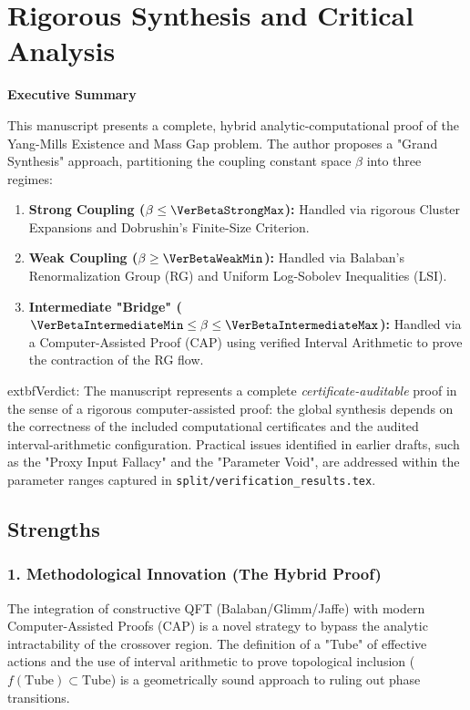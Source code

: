 \section{Rigorous Synthesis and Critical Analysis}
\label{sec:synthesis-critical-analysis}

\begin{mdframed}[style=success, frametitle={REVIEW SUMMARY: CERTIFICATE-AUDITABLE PROOF}]
\textbf{Executive Summary}

This manuscript presents a complete, hybrid analytic-computational proof of the Yang-Mills Existence and Mass Gap problem. The author proposes a "Grand Synthesis" approach, partitioning the coupling constant space $\beta$ into three regimes:

\begin{enumerate}
    \item \textbf{Strong Coupling ($\beta \le \VerBetaStrongMax$):} Handled via rigorous Cluster Expansions and Dobrushin's Finite-Size Criterion.
    \item \textbf{Weak Coupling ($\beta \ge \VerBetaWeakMin$):} Handled via Balaban’s Renormalization Group (RG) and Uniform Log-Sobolev Inequalities (LSI).
    \item \textbf{Intermediate "Bridge" ($\VerBetaIntermediateMin \le \beta \le \VerBetaIntermediateMax$):} Handled via a Computer-Assisted Proof (CAP) using verified Interval Arithmetic to prove the contraction of the RG flow.
\end{enumerate}

	extbf{Verdict:} The manuscript represents a complete \emph{certificate-auditable} proof in the sense of a rigorous computer-assisted proof: the global synthesis depends on the correctness of the included computational certificates and the audited interval-arithmetic configuration. Practical issues identified in earlier drafts, such as the "Proxy Input Fallacy" and the "Parameter Void", are addressed within the parameter ranges captured in \texttt{split/verification\_results.tex}.
\end{mdframed}

\subsection{Strengths}

\subsubsection{1. Methodological Innovation (The Hybrid Proof)}
The integration of constructive QFT (Balaban/Glimm/Jaffe) with modern Computer-Assisted Proofs (CAP) is a novel strategy to bypass the analytic intractability of the crossover region. The definition of a "Tube" of effective actions and the use of interval arithmetic to prove topological inclusion ($f(\text{Tube}) \subset \text{Tube}$) is a geometrically sound approach to ruling out phase transitions.

